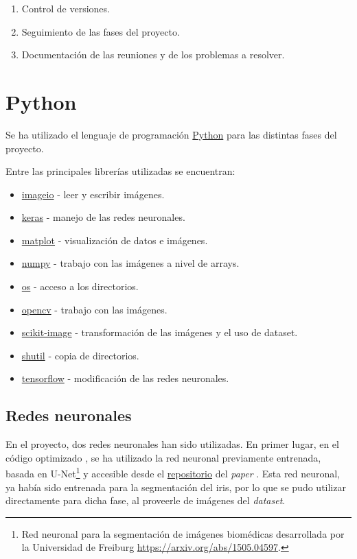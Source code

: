 \begin{enumerate}
    \item Control de versiones.
    \item Seguimiento de las fases del proyecto.
    \item Documentación de las reuniones y de los problemas a resolver.
\end{enumerate}

\section{Python}

Se ha utilizado el lenguaje de programación \href{https://www.python.org/}{Python} para las distintas fases del proyecto.

Entre las principales librerías utilizadas se encuentran:

\begin{itemize}
    \item \href{https://imageio.readthedocs.io/en/stable/}{imageio} - leer y escribir imágenes.
    \item \href{https://keras.io/}{keras} - manejo de las redes neuronales.
    \item \href{https://matplotlib.org/}{matplot} - visualización de datos e imágenes.
    \item \href{https://numpy.org/}{numpy} - trabajo con las imágenes a nivel de arrays.
    \item \href{https://docs.python.org/3/library/os.html}{os} - acceso a los directorios.
    \item \href{https://opencv.org/}{opencv} - trabajo con las imágenes.
    \item \href{https://scikit-image.org/}{scikit-image} - transformación de las imágenes y el uso de dataset.
    \item \href{https://docs.python.org/3/library/shutil.html}{shutil} - copia de directorios.
    \item \href{https://www.tensorflow.org/}{tensorflow} - modificación de las redes neuronales.
\end{itemize}

\subsection{Redes neuronales}

En el proyecto, dos redes neuronales han sido utilizadas. En primer lugar, en el código optimizado \cite{tfg_iris_2020}, se ha utilizado la red neuronal previamente entrenada, basada en U-Net\footnote{Red neuronal para la segmentación de imágenes biomédicas desarrollada por la Universidad de Freiburg \url{https://arxiv.org/abs/1505.04597}.} y accesible desde el \href{https://github.com/jus390/U-net-Iris-segmentation}{repositorio} del \textit{paper} \cite{lozej_end--end_2018}. Esta red neuronal, ya había sido
entrenada para la segmentación del iris, por lo que se pudo utilizar directamente para dicha fase, al proveerle de imágenes del \textit{dataset}.

